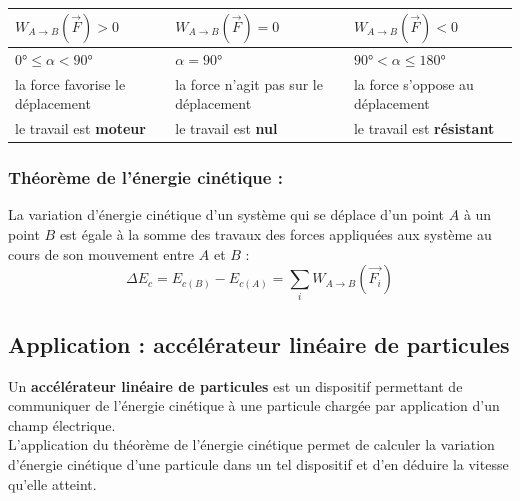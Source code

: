 \documentclass[a4paper,12pt,fleqn]{article}%
\begin{document}
		\vspace*{1cm}
		
		\begin{tabular}{|>{\centering}m{5cm}|>{\centering}m{5cm}|>{\centering\arraybackslash}m{5cm}|}
		\hline $W_{A \rightarrow B}(\vec{F}) > 0$ & $W_{A \rightarrow B}(\vec{F}) = 0$ & $W_{A \rightarrow B}(\vec{F}) < 0$\\
		\hline $0° \leq \alpha < 90°$ & $\alpha = 90°$ & $90° < \alpha \leq 180°$\\
		\hline la force favorise le déplacement & la force n'agit pas sur le déplacement & la force s'oppose au déplacement\\
		\hline le travail est \textbf{moteur} & le travail est \textbf{nul} & le travail est \textbf{résistant}\\
		\hline		
		\end{tabular}
		\subsubsection*{Théorème de l'énergie cinétique :}
		La variation d'énergie cinétique d'un système qui se déplace d'un point $A$ à un point $B$ est égale à la somme des travaux des forces appliquées aux système au cours de son mouvement entre $A$ et $B$  :
		$$\Delta E_c = E_{c(B)} - E_{c(A)} = \sum_i W_{A \rightarrow B}(\vec{F_i})$$
	\subsection{Application : accélérateur linéaire de particules}
	Un \textbf{accélérateur linéaire de particules} est un dispositif permettant de communiquer de l'énergie cinétique à une particule chargée par application d'un champ électrique.\\
	L'application du théorème de l'énergie cinétique permet de calculer la variation d'énergie cinétique d'une particule dans un tel dispositif et d'en déduire la vitesse qu'elle atteint.
\end{document}
